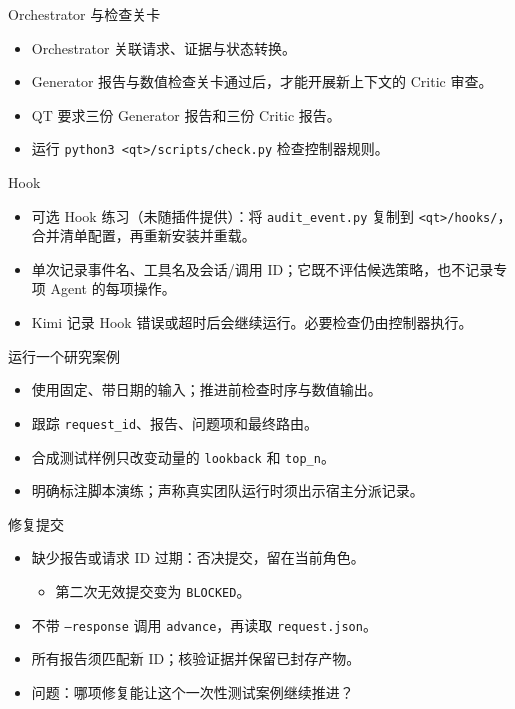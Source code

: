 \begin{frame}{Orchestrator 与检查关卡}

\medskip
\begin{itemize}
\item Orchestrator 关联请求、证据与状态转换。
\item Generator 报告与数值检查关卡通过后，才能开展新上下文的 Critic 审查。
\item QT 要求三份 Generator 报告和三份 Critic 报告。
\item 运行 \texttt{python3 <qt>/scripts/check.py} 检查控制器规则。
\end{itemize}
\end{frame}

\begin{frame}{Hook}
\begin{center}

\end{center}
\begin{itemize}
\item 可选 Hook 练习（未随插件提供）：将 \texttt{audit\_event.py} 复制到 \texttt{<qt>/hooks/}，合并清单配置，再重新安装并重载。
\item 单次记录事件名、工具名及会话/调用 ID；它既不评估候选策略，也不记录专项 Agent 的每项操作。
\item Kimi 记录 Hook 错误或超时后会继续运行。必要检查仍由控制器执行。
\end{itemize}
\end{frame}

\begin{frame}{运行一个研究案例}
\begin{center}

\end{center}
\begin{itemize}
\item 使用固定、带日期的输入；推进前检查时序与数值输出。
\item 跟踪 \texttt{request\_id}、报告、问题项和最终路由。
\item 合成测试样例只改变动量的 \texttt{lookback} 和 \texttt{top\_n}。
\item 明确标注脚本演练；声称真实团队运行时须出示宿主分派记录。
\end{itemize}
\end{frame}

\begin{frame}{修复提交\handsup}
\begin{itemize}
\item 缺少报告或请求 ID 过期：否决提交，留在当前角色。
\begin{itemize}
\item 第二次无效提交变为 \texttt{BLOCKED}。
\end{itemize}
\item 不带 \texttt{--response} 调用 \texttt{advance}，再读取 \texttt{request.json}。
\item 所有报告须匹配新 ID；核验证据并保留已封存产物。
\item 问题：哪项修复能让这个一次性测试案例继续推进？
\end{itemize}
\end{frame}

